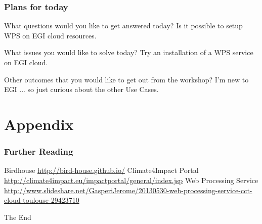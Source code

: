 \documentclass{beamer}
\begin{document}

   \begin{frame}
    \frametitle{Plans for today}
    \begin{block}{What questions would you like to get answered today?}
      Is it possible to setup WPS on EGI cloud resources.
    \end{block}
    \begin{block}{What issues you would like to solve today?}
      Try an installation of a WPS service on EGI cloud.
    \end{block}
    \begin{block}{Other outcomes that you would like to get out from the workshop?}
      I'm new to EGI ... so just curious about the other Use Cases.
    \end{block}
  \end{frame}


  \appendix

  \section{Appendix}
  
   \begin{frame}[allowframebreaks]
    \frametitle<presentation>{Further Reading}    
    \begin{thebibliography}{10}    
      \beamertemplatearticlebibitems
      Birdhouse
      \newblock \url{http://bird-house.github.io/}
      Climate4Impact Portal
      \newblock \url{http://climate4impact.eu/impactportal/general/index.jsp}
      Web Processing Service
      \newblock \url{http://www.slideshare.net/GasperiJerome/20130530-web-processing-service-cct-cloud-toulouse-29423710}
   
    \end{thebibliography}
    
  \end{frame}
  

  \begin{frame}
    \Huge{\centerline{The End}}
  \end{frame}

\end{document}
